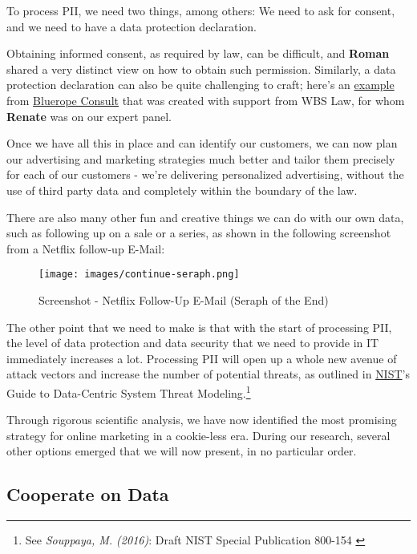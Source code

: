 To process PII, we need two things, among others: We need to ask for consent, and we need to have a data protection declaration.

Obtaining informed consent, as required by law, can be difficult, and \textbf{Roman} shared a very distinct view on how to obtain such permission. Similarly, a data protection declaration can also be quite challenging to craft; here's an \href{https://blueropeconsultonline.de/datenschutz/}{example} from \href{https://blueropeconsultonline.de/}{Bluerope Consult} that was created with support from WBS Law, for whom \textbf{Renate} was on our expert panel.

Once we have all this in place and can identify our customers, we can now plan our advertising and marketing strategies much better and tailor them precisely for each of our customers - we're delivering personalized advertising, without the use of third party data and completely within the boundary of the law.

There are also many other fun and creative things we can do with our own data, such as following up on a sale or a series, as shown in the following screenshot from a Netflix follow-up E-Mail:

\begin{figure}[H]
\centering
\caption {Screenshot - Netflix Follow-Up E-Mail (Seraph of the End)}
\texttt{[image: images/continue-seraph.png]}
\label{fig:seraph}
\end{figure}

The other point that we need to make is that with the start of processing PII, the level of data protection and data security that we need to provide in IT immediately increases a lot. Processing PII will open up a whole new avenue of attack vectors and increase the number of potential threats, as outlined in \href{https://www.nist.gov/}{NIST}'s Guide to Data-Centric System Threat Modeling.\footnote{See \textit{Souppaya, M. (2016)}: Draft NIST Special Publication 800-154 \cite{sp800_154_draft}}

Through rigorous scientific analysis, we have now identified the most promising strategy for online marketing in a cookie-less era. During our research, several other options emerged that we will now present, in no particular order.

\subsection{Cooperate on Data}

